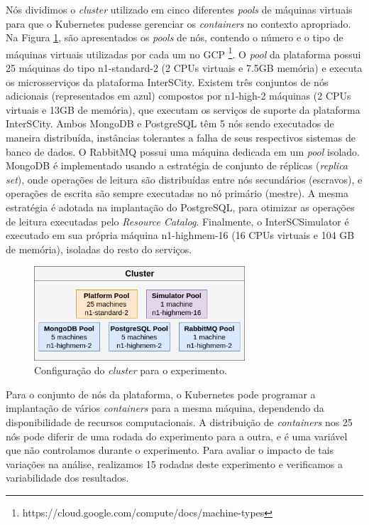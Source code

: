 Nós dividimos o \textit{cluster} utilizado em cinco diferentes \textit{pools} de máquinas virtuais para que o Kubernetes pudesse gerenciar os \textit{containers} no contexto apropriado.
Na Figura \ref{fig:node-pools}, são apresentados os \textit{pools} de nós, contendo o número e o tipo de máquinas virtuais utilizadas por cada um no GCP
\footnote{https://cloud.google.com/compute/docs/machine-types}.
O \textit{pool} da plataforma possui 25 máquinas do tipo n1-standard-2 (2 CPUs virtuais e 7.5GB memória) e executa os microsserviços da plataforma InterSCity.
Existem três conjuntos de nós adicionais (representados em azul) compostos por n1-high-2 máquinas (2 CPUs virtuais e 13GB de memória), que executam os serviços de suporte da plataforma InterSCity.
Ambos MongoDB e PostgreSQL têm 5 nós sendo executados de maneira distribuída, instâncias tolerantes a falha de seus respectivos sistemas de banco de dados.
O RabbitMQ possui uma máquina dedicada em um \textit{pool} isolado.
MongoDB é implementado usando a estratégia de conjunto de réplicas (\textit{replica set}), onde operações de leitura são distribuídas entre nós secundários (escravos), e operações de escrita são
sempre executadas no nó primário (mestre).
A mesma estratégia é adotada na implantação do PostgreSQL, para otimizar as operações de leitura executadas pelo \textit{Resource Catalog}.
Finalmente, o InterSCSimulator é executado em sua própria máquina n1-highmem-16 (16 CPUs virtuais e 104 GB de memória), isoladas do resto do serviços.

\begin{figure}[ht]
	\centering
	\includegraphics[width=0.7\textwidth]{figuras/node-pools.png}
    \caption{Configuração do \textit{cluster} para o experimento.}
	\label{fig:node-pools}
\end{figure}


Para o conjunto de nós da plataforma, o Kubernetes pode programar a implantação de vários \textit{containers} para a mesma máquina, dependendo da disponibilidade de recursos computacionais.
A distribuição de \textit{containers} nos 25 nós pode diferir de uma rodada do experimento para a outra, e é uma variável que não controlamos durante o experimento.
Para avaliar o impacto de tais variações na análise, realizamos 15 rodadas deste experimento e verificamos a variabilidade dos resultados.

